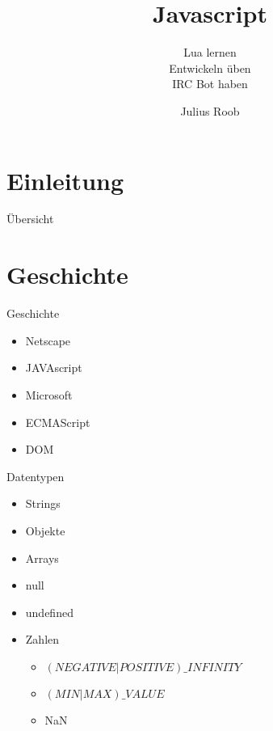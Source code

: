 \documentclass{beamer}
\author{Julius Roob}
\title{Javascript}
\subtitle{Lua lernen \checked\\Entwickeln üben \checked\\IRC Bot haben \checked}
\institute{Chaos inKL.}
\date{}
\begin{document}
	\section{Einleitung}
		\begin{frame}
			\titlepage
		\end{frame}
	
		\begin{frame}{Übersicht}
			\tableofcontents
		\end{frame}
	
	
	\section{Geschichte}
		\begin{frame}{Geschichte}{}
			\begin{itemize}
				\item Netscape
				\item JAVAscript
				\item Microsoft
				\item ECMAScript
				\item DOM
			\end{itemize}
		\end{frame}

		\begin{frame}{Datentypen}{}
			\begin{itemize}
				\item Strings
				\item Objekte
				\item Arrays
				\item null
				\item undefined
				\item Zahlen
					\begin{itemize}
						\item $(NEGATIVE|POSITIVE)\_INFINITY$
						\item $(MIN|MAX)\_VALUE$
						\item NaN
					\end{itemize}
			\end{itemize}
		\end{frame}
\end{document}
